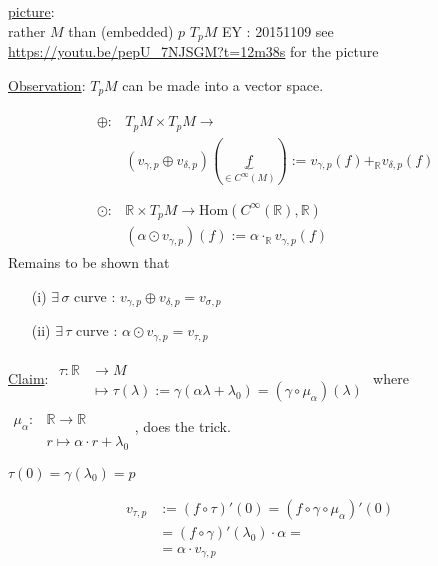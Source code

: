 \documentclass[10pt, twoside]{amsart}
\begin{document}
\begin{multicols*}{2}
\underline{picture}:\\
rather $M$ than (embedded) $p$ $T_pM$ EY : 20151109 see \url{https://youtu.be/pepU_7NJSGM?t=12m38s} for the picture

\underline{Observation}: $T_pM$ can be made into a vector space. 

\[
\begin{aligned}
& \begin{aligned}
  \oplus : & T_pM \times T_pM \to   \\
  & (v_{\gamma,p} \oplus v_{\delta,p})(\underbrace{f}_{ \in C^{\infty}(M)} ) := v_{\gamma,p}(f) +_{\mathbb{R}} v_{\delta,p}(f) \\
  \end{aligned} \\
& \begin{aligned}
    \odot : & \mathbb{R} \times T_pM \to \text{Hom}(C^{\infty}(\mathbb{R}),\mathbb{R}) \\
    & (\alpha \odot v_{\gamma,p} )(f) := \alpha \cdot_{\mathbb{R}}  v_{\gamma, p}(f)
\end{aligned}
\end{aligned}
\]
Remains to be shown that 
\begin{enumerate}
  \item[(i)] $\exists \, \sigma$ curve : $v_{\gamma,p} \oplus v_{\delta,p} = v_{\sigma,p}$
  \item[(ii)] $\exists \, \tau $ curve : $\alpha \odot v_{\gamma,p} = v_{\tau,p}$
\end{enumerate}

\underline{Claim}: $\begin{aligned} & \quad \\ 
  \tau : \mathbb{R}&  \to M  \\
  & \mapsto \tau(\lambda) := \gamma(\alpha  \lambda + \lambda_0) = (\gamma \circ \mu_{\alpha})(\lambda)
\end{aligned}$
where $\begin{aligned} & \quad \\
   \mu_{\alpha}: & \mathbb{R} \to \mathbb{R} \\ 
   & r \mapsto \alpha \cdot r + \lambda_0 \end{aligned}$, 
does the trick.

$\tau(0) = \gamma(\lambda_0) =p$

\[
\begin{aligned}
  v_{\tau,p} & := (f\circ \tau)'(0) = (f\circ \gamma \circ \mu_{\alpha} )'(0) \\ 
  & =  (f\circ \gamma)'(\lambda_0) \cdot \alpha = \\
  & = \alpha \cdot v_{\gamma,p}
\end{aligned}
\]


\end{multicols*}
\end{document}

